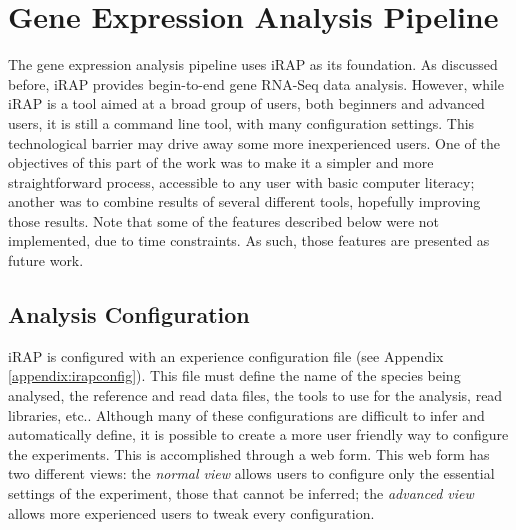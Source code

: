 \section{Gene Expression Analysis Pipeline}


The gene expression analysis pipeline uses iRAP as its foundation. As discussed
before, iRAP provides begin-to-end gene RNA-Seq data analysis. However, while
iRAP is a tool aimed at a broad group of users, both beginners and advanced
users, it is still a command line tool, with many configuration settings. This
technological barrier may drive away some more inexperienced users. One of the
objectives of this part of the work was to make it a simpler and more
straightforward process, accessible to any user with basic computer literacy;
another was to combine results of several different tools, hopefully improving
those results. Note that some of the features described below were not
implemented, due to time constraints. As such, those features are presented as
future work.

\subsection{Analysis Configuration}

iRAP is configured with an experience configuration file (see Appendix
\ref{appendix:irapconfig}). This file must define the name of the species being
analysed, the reference and read data files, the tools to use for the analysis,
read libraries, etc.. Although many of these configurations are difficult to
infer and automatically define, it is possible to create a more user friendly
way to configure the experiments. This is accomplished through a web form. This
web form has two different views: the \emph{normal view} allows users to
configure only the essential settings of the experiment, those that cannot be
inferred; the \emph{advanced view} allows more experienced users to tweak every
configuration.

